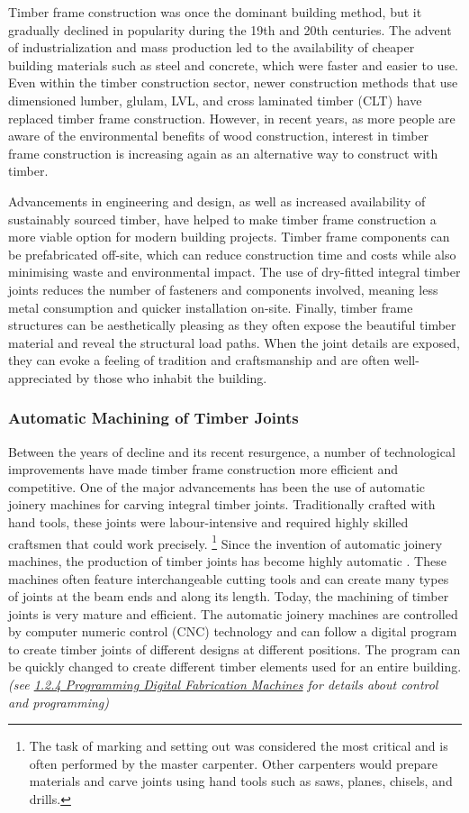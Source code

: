 Timber frame construction was once the dominant building method, but it gradually declined in popularity during the 19th and 20th centuries. The advent of industrialization and mass production led to the availability of cheaper building materials such as steel and concrete, which were faster and easier to use. Even within the timber construction sector, newer construction methods that use dimensioned lumber, glulam, LVL, and cross laminated timber (CLT) have replaced timber frame construction. However, in recent years, as more people are aware of the environmental benefits of wood construction, interest in timber frame construction is increasing again as an alternative way to construct with timber. 

Advancements in engineering and design, as well as increased availability of sustainably sourced timber, have helped to make timber frame construction a more viable option for modern building projects. Timber frame components can be prefabricated off-site, which can reduce construction time and costs while also minimising waste and environmental impact. The use of dry-fitted integral timber joints reduces the number of fasteners and components involved, meaning less metal consumption and quicker installation on-site. Finally, timber frame structures can be aesthetically pleasing as they often expose the beautiful timber material and reveal the structural load paths. When the joint details are exposed, they can evoke a feeling of tradition and craftsmanship and are often well-appreciated by those who inhabit the building.

\subsubsection{Automatic Machining of Timber Joints}

Between the years of decline and its recent resurgence, a number of technological improvements have made timber frame construction more efficient and competitive. One of the major advancements has been the use of automatic joinery machines for carving integral timber joints. Traditionally crafted with hand tools, these joints were labour-intensive and required highly skilled craftsmen that could work precisely.
\footnote{The task of marking and setting out was considered the most critical and is often performed by the master carpenter. Other carpenters would prepare materials and carve joints using hand tools such as saws, planes, chisels, and drills.}
Since the invention of automatic joinery machines, the production of timber joints has become highly automatic \parencite{hanshundeggeragCorporateDevelopment2023}. These machines often feature interchangeable cutting tools and can create many types of joints at the beam ends and along its length. Today, the machining of timber joints is very mature and efficient. The automatic joinery machines are controlled by computer numeric control (CNC) technology and can follow a digital program to create timber joints of different designs at different positions. The program can be quickly changed to create different timber elements used for an entire building. 
\textit{(see \ul{1.2.4 Programming Digital Fabrication Machines} for details about control and programming)}

